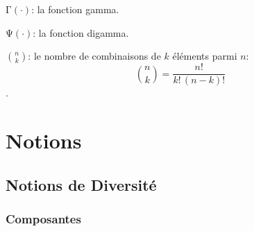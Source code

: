 \documentclass[
  11pt,
  american,
  a4paper,
  extrafontsizes,onecolumn,openright
  ]{memoir}
\begin{document}
\noindent \(\mathrm{\Gamma}(\cdot)\): la fonction gamma.

\noindent \(\mathrm{\Psi}(\cdot)\): la fonction digamma.

\noindent \(\binom{n}{k}\): le nombre de combinaisons de \(k\) éléments parmi \(n\): \[\binom{n}{k}=\frac{n!}{k!\,(n-k)!}\].

\mainmatter

\hypertarget{part-notions}{%
\part{Notions}\label{part-notions}}

\hypertarget{chap-Notions}{%
\chapter{Notions de Diversité}\label{chap-Notions}}

\hypertarget{composantes}{%
\section{Composantes}\label{composantes}}



\scriptsize
\end{document}
